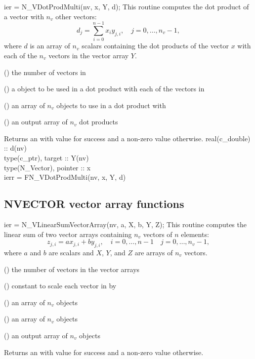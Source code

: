 {
  ier = N\_VDotProdMulti(nv, x, Y, d);
}
{
  This routine computes the dot product of a vector with $n_v$ other vectors:
  \begin{equation*}
    d_j = \sum_{i=0}^{n-1} x_i y_{j,i}, \quad j=0,\ldots,n_v-1,
  \end{equation*}
  where $d$ is an array of $n_v$ scalars containing the dot products of the
  vector $x$ with each of the $n_v$ vectors in the vector array $Y$.
}
{
  \begin{args}[nv]
  \item[nv] () the number of vectors in 
  \item[x] () a {\nvector} object to be used in a dot product
    with each of the vectors in 
  \item[Y] () an array of $n_v$ {\nvector} objects to use
    in a dot product with 
  \item[d] () an output array of $n_v$ dot products 
  \end{args}
}
{
  Returns an  with value  for success and a non-zero value otherwise.
}
{}
{
  real(c\_double) :: d(nv)\\
  type(c\_ptr), target :: Y(nv)\\
  type(N\_Vector), pointer :: x\\
  ierr = FN\_VDotProdMulti(nv, x, Y, d)
}


\subsection{NVECTOR vector array functions}\label{ss:nvecarrayops}


{
  ier = N\_VLinearSumVectorArray(nv, a, X, b, Y, Z);
}
{
  This routine computes the linear sum of two vector arrays containing $n_v$
  vectors of $n$ elements:
  \begin{equation*}
    z_{j,i} = a x_{j,i} + b y_{j,i}, \quad i=0,\ldots,n-1 \quad j=0,\ldots,n_v-1,
  \end{equation*}
  where $a$ and $b$ are scalars and $X$, $Y$, and $Z$ are arrays of $n_v$ vectors.
}
{
  \begin{args}[nv]
  \item[nv] () the number of vectors in the vector arrays
  \item[a] () constant to scale each vector in  by
  \item[X] () an array of $n_v$ {\nvector} objects
  \item[Y] () an array of $n_v$ {\nvector} objects
  \item[Z] () an output array of $n_v$ {\nvector} objects
  \end{args}
}
{
  Returns an  with value  for success and a non-zero value otherwise.
}
{}

